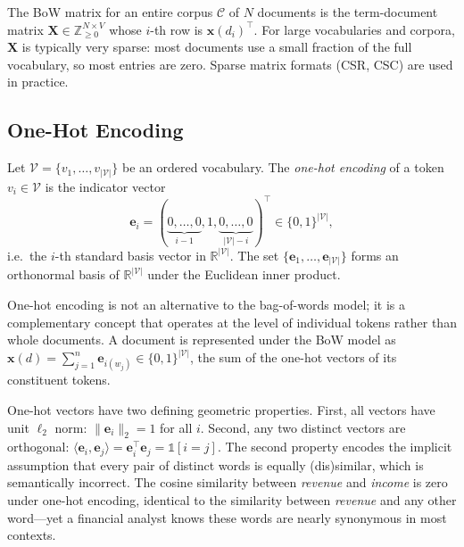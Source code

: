 \begin{deepdive}
The BoW matrix for an entire corpus $\mathcal{C}$ of $N$ documents is the term-document
matrix $\mathbf{X} \in \mathbb{Z}_{\geq 0}^{N \times V}$ whose $i$-th row is
$\mathbf{x}(d_i)^\top$.  For large vocabularies and corpora, $\mathbf{X}$ is typically
very sparse: most documents use a small fraction of the full vocabulary, so most entries
are zero.  Sparse matrix formats (CSR, CSC) are used in practice.

\subsection{One-Hot Encoding}
\label{sec:classical-onehot}

\begin{definition}
\label{def:one-hot}
Let $\mathcal{V} = \{v_1, \ldots, v_{|\mathcal{V}|}\}$ be an ordered vocabulary.  The \emph{one-hot
encoding} of a token $v_i \in \mathcal{V}$ is the indicator vector
\[
  \mathbf{e}_i = (\underbrace{0, \ldots, 0}_{i-1}, 1,
                  \underbrace{0, \ldots, 0}_{|\mathcal{V}| - i})^\top \in \{0,1\}^{|\mathcal{V}|},
\]
i.e.\ the $i$-th standard basis vector in $\mathbb{R}^{|\mathcal{V}|}$.  The set
$\{\mathbf{e}_1, \ldots, \mathbf{e}_{|\mathcal{V}|}\}$ forms an orthonormal basis of $\mathbb{R}^{|\mathcal{V}|}$
under the Euclidean inner product.
\end{definition}

One-hot encoding is not an alternative to the bag-of-words model; it is a complementary
concept that operates at the level of individual tokens rather than whole documents.  A
document is represented under the BoW model as $\mathbf{x}(d) = \sum_{j=1}^{n}
\mathbf{e}_{i(w_j)} \in \{0,1\}^{|\mathcal{V}|}$, the sum of the one-hot vectors of its constituent tokens.

One-hot vectors have two defining geometric properties.  First, all vectors have unit
$\ell_2$ norm: $\|\mathbf{e}_i\|_2 = 1$ for all $i$.  Second, any two distinct vectors
are orthogonal: $\langle \mathbf{e}_i, \mathbf{e}_j \rangle = \mathbf{e}_i^\top
\mathbf{e}_j = \mathbb{1}[i = j]$.  The second property encodes the implicit
assumption that every pair of distinct words is equally (dis)similar, which is
semantically incorrect.  The cosine similarity between \textit{revenue} and
\textit{income} is zero under one-hot encoding, identical to the similarity between
\textit{revenue} and any other word---yet a financial analyst knows these words are
nearly synonymous in most contexts.


\end{deepdive}
